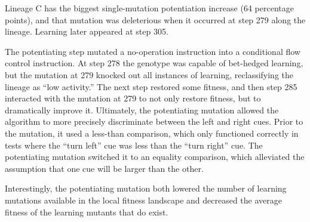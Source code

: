 Lineage C has the biggest single-mutation potentiation increase (64 percentage points), and that mutation was deleterious when it occurred at step 279 along the lineage.  Learning later appeared at step 305. 

The potentiating step mutated a no-operation instruction into a conditional flow control instruction. 
At step 278 the genotype was capable of bet-hedged learning, but the mutation at 279 knocked out all instances of learning, reclassifying the lineage as ``low activity.'' %
The next step restored some fitness, and then step 285 interacted with the mutation at 279 to not only restore fitness, but to dramatically improve it. 
Ultimately, the potentiating mutation allowed the algorithm to more precisely discriminate between the left and right cues. 
Prior to the mutation, it used a less-than comparison, which only functioned correctly in tests where the ``turn left'' cue was less than the ``turn right'' cue. %
The potentiating mutation switched it to an equality comparison, which alleviated the assumption that one cue will be larger than the other.

Interestingly, the potentiating mutation both lowered the number of learning mutations available in the local fitness landscape and decreased the average fitness of the learning mutants that do exist. 









